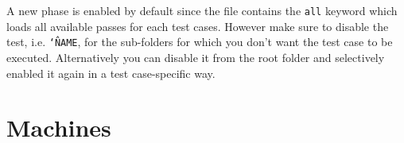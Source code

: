 A new phase is enabled by default since the  file contains the
{\tt all} keyword which loads all available passes for each test cases. However
make sure to disable the test, i.e. {\tt \char`\^NAME}, for the sub-folders for
which you don't want the test case to be executed. Alternatively you can disable
it from the root folder and selectively enabled it again in a test case-specific
way. 

\section{Machines}

